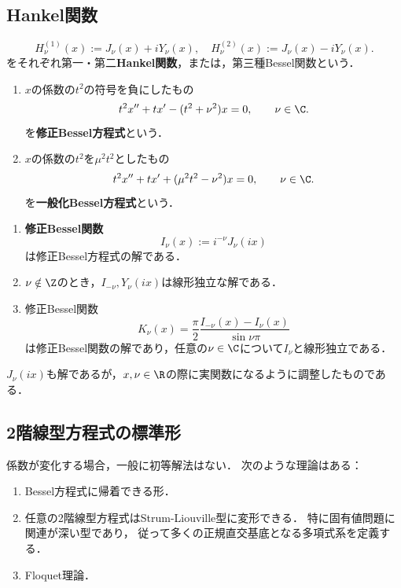 \documentclass[uplatex,dvipdfmx]{jsreport}
\begin{document}
\subsection{Hankel関数}

\begin{definition}
    \[H_\nu^{(1)}(x):=J_\nu(x)+iY_\nu(x),\quad H_\nu^{(2)}(x):=J_\nu(x)-iY_\nu(x).\]
    をそれぞれ第一・第二\textbf{Hankel関数}，または，第三種Bessel関数という．
\end{definition}

\begin{problem}\mbox{}
    \begin{enumerate}
        \item $x$の係数の$t^2$の符号を負にしたもの
        \[t^2x''+tx'-(t^2+\nu^2)x=0,\qquad\nu\in\C.\]
        を\textbf{修正Bessel方程式}という．
        \item  $x$の係数の$t^2$を$\mu^2t^2$としたもの
        \[t^2x''+tx'+(\mu^2t^2-\nu^2)x=0,\qquad\nu\in\C.\]
        を\textbf{一般化Bessel方程式}という．
    \end{enumerate}
\end{problem}

\begin{proposition}\mbox{}
    \begin{enumerate}
        \item \textbf{修正Bessel関数}
        \[I_\nu(x):=i^{-\nu}J_\nu(ix)\]
        は修正Bessel方程式の解である．
        \item $\nu\notin\Z$のとき，$I_{-\nu},Y_\nu(ix)$は線形独立な解である．
        \item 修正Bessel関数
        \[K_\nu(x)=\frac{\pi}{2}\frac{I_{-\nu}(x)-I_\nu(x)}{\sin\nu\pi}\]
        は修正Bessel関数の解であり，任意の$\nu\in\C$について$I_\nu$と線形独立である．
    \end{enumerate}
\end{proposition}
\begin{remark}
    $J_\nu(ix)$も解であるが，$x,\nu\in\R$の際に実関数になるように調整したものである．
\end{remark}

\subsection{2階線型方程式の標準形}

\begin{tcolorbox}[colframe=ForestGreen, colback=ForestGreen!10!white,breakable,colbacktitle=ForestGreen!40!white,coltitle=black,fonttitle=\bfseries\sffamily,
title=]
    係数が変化する場合，一般に初等解法はない．
    次のような理論はある：
    \begin{enumerate}
        \item Bessel方程式に帰着できる形．
        \item 任意の2階線型方程式はStrum-Liouville型に変形できる．
        特に固有値問題に関連が深い型であり，
        従って多くの正規直交基底となる多項式系を定義する．
        \item Floquet理論．
    \end{enumerate}
\end{tcolorbox}
\end{document}
